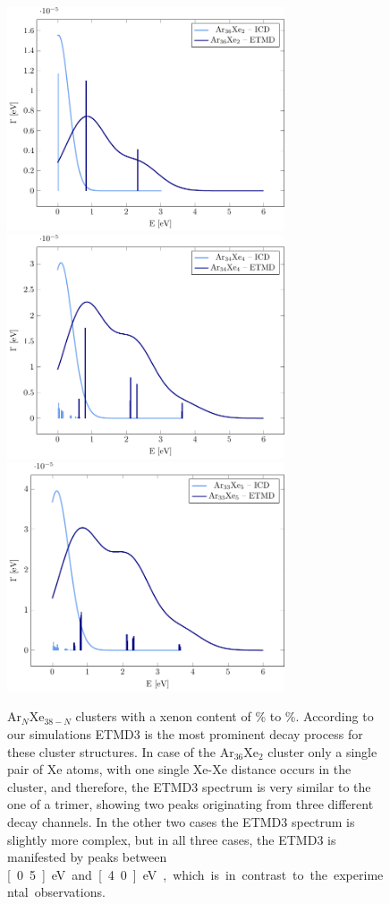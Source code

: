 \begin{figure}
 \centering
 \includegraphics[width=8.2cm]{pics/Ar36Xe2.pdf}
 \includegraphics[width=8.2cm]{pics/Ar34Xe4.pdf}
 \includegraphics[width=8.2cm]{pics/Ar33Xe5.pdf}
 \caption{Ar$_N$Xe$_{38-N}$ clusters with a xenon content of
          \unit[5]{\%} to \unit[13]{\%}.
          According to our simulations ETMD3 is the most prominent decay
          process for these cluster structures.
          In case of the Ar$_{36}$Xe$_2$ cluster only a single pair of Xe
          atoms, with one single Xe-Xe distance occurs in the cluster,
          and therefore, the ETMD3 spectrum is very similar
          to the one of a trimer, showing two peaks originating
          from three different decay channels. In the other two cases the ETMD3
          spectrum is slightly more complex, but in all three cases, the ETMD3
          is manifested by peaks between \unit[0.5]{eV} and \unit[4.0]{eV}, which 
          is in contrast to the experimental observations.}
 \label{figure:ArXe_lt15}
\end{figure}

